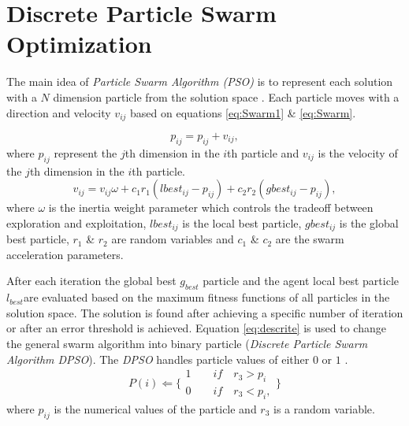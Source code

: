 \documentclass[preprint,10pt,5p,twocolumn]{elsarticle}
\begin{document}

\section{Discrete Particle Swarm Optimization}
\label{sec:ParticleSwarmAlgorithm}
The main idea of \textit{Particle Swarm Algorithm (PSO)} is to represent each solution with a $N$ dimension particle from the solution space \cite{PSOFirst}. Each particle moves with a direction and velocity $v_{ij}$ based on equations \ref{eq:Swarm1} \& \ref{eq:Swarm}.

\begin{equation}
p_{ij}=p_{ij}+v_{ij},
\label{eq:Swarm1}
\end{equation}
where $p_{ij}$ represent the $j$th dimension in the $i$th particle and $v_{ij}$ is the velocity of the $j$th dimension in the $i$th particle.
 \begin{equation}
v_{ij}  = v_{ij} \omega + c_1 r_1 (lbest_{ij}  - p_{ij} ) + c_2 r_2 (gbest_{ij}  - p_{ij} ),
\label{eq:Swarm}
\end{equation}
 where  $\omega$ is the inertia weight parameter which controls the tradeoff between exploration and exploitation,  $lbest_{ij}$ is the local best particle, $gbest_{ij}$ is the global best particle, $r_1$ \& $r_2$ are random variables and $c_1$ \& $c_2$ are the swarm acceleration parameters.

 After each iteration the global best $g_{best}$ particle and the agent local best particle $l_{best}$are evaluated based on the maximum fitness functions of all particles in the solution space. The solution is found after achieving a specific number of iteration or after an error threshold is achieved.
Equation \ref{eq:descrite} is used to change the general swarm algorithm into binary particle (\textit{Discrete Particle Swarm Algorithm DPSO}). The \textit{DPSO} handles particle values of either $0$ or $1$ \cite{PSODisceret}.  
\begin{equation}
   P(i)\Leftarrow 
\{
\begin{array}{c} 
1 \quad \quad if\quad r_{3}>p_{i}  \\

0 \quad \quad if\quad r_{3}<p_{i}, 
\label{eq:descrite}
\end{array}\}
\end{equation}
 where $p_{ij}$ is the numerical values of the particle and $r_{3}$ is a random variable. 
\end{document}

